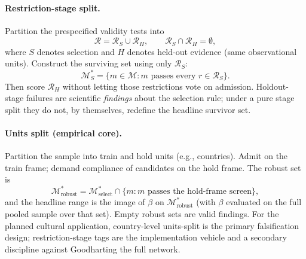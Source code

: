 \documentclass[10pt,letterpaper]{article}
\newcommand{\M}{\ensuremath{\mathcal{M}}}
\newcommand{\Rset}{\mathcal{R}}
\begin{document}
\paragraph{Restriction-stage split.}
Partition the prespecified validity tests into
\begin{equation}
\Rset=\Rset_S\cup\Rset_H,\qquad \Rset_S\cap\Rset_H=\emptyset,
\label{eq:partition}
\end{equation}
where $S$ denotes selection and $H$ denotes held-out evidence (same observational units).
Construct the surviving set using only $\Rset_S$:
\begin{equation}
\M^*_S=\bigl\{m\in\M: m\text{ passes every }r\in\Rset_S\bigr\}.
\label{eq:Mselect}
\end{equation}
Then score $\Rset_H$ without letting those restrictions vote on admission.
Holdout-stage failures are scientific \emph{findings} about the selection rule; under a pure stage split they do not, by themselves, redefine the headline survivor set.

\paragraph{Units split (empirical core).}
Partition the sample into train and hold units (e.g., countries).
Admit on the train frame; demand compliance of candidates on the hold frame.
The robust set is
\begin{equation}
\M^*_{\mathrm{robust}}=\M^*_{\mathrm{select}}\cap\bigl\{m:\text{$m$ passes the hold-frame screen}\bigr\},
\label{eq:Mrobust}
\end{equation}
and the headline range is the image of $\beta$ on $\M^*_{\mathrm{robust}}$ (with $\beta$ evaluated on the full pooled sample over that set).
Empty robust sets are valid findings.
For the planned cultural application, country-level units-split is the primary falsification design; restriction-stage tags are the implementation vehicle and a secondary discipline against Goodharting the full network.
\end{document}
